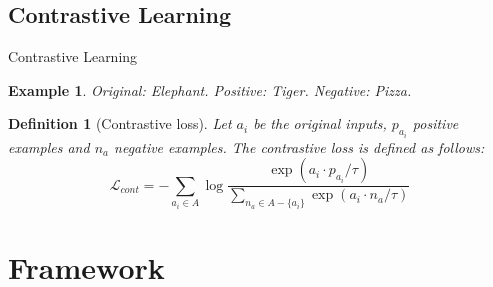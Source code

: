 \documentclass[aspectratio=169]{beamer}
\newtheorem{defi}{Definition}
\newtheorem{ex}{Example}
\begin{document}
  \subsection{Contrastive Learning}

  \begin{frame}{Contrastive Learning}
    
    

    \begin{ex}
      Original: Elephant. Positive: Tiger. Negative: Pizza.
    \end{ex}

    \begin{defi}[Contrastive loss]
      Let \(a_i\) be the original inputs, \(p_{a_i}\) positive examples and \(n_{a}\) negative examples. The contrastive loss is defined as follows:
      \[
      \mathcal L_{cont} = - \sum_{a_i \in A} \log \frac{\exp(a_i \cdot p_{a_i}/\tau)}{\sum_{n_a \in A - \{ a_i \} } \exp(a_i \cdot n_a / \tau)}  
      \]
    \end{defi}
  \end{frame}


  \section{Framework}

 
\end{document}
